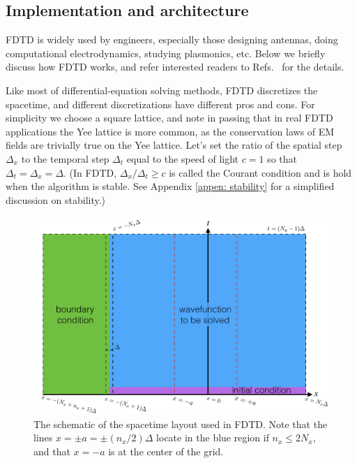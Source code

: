\documentclass[12pt,letter,onecolumn,notitlepage]{article}
\begin{document}
\subsection{Implementation and architecture}
FDTD is widely used by engineers, especially those designing antennas, doing computational electrodynamics, studying plasmonics, etc. 
Below we briefly discuss how FDTD works, and refer interested readers to Refs.~\cite{FDTDbook,FDTDnote} for the details.

Like most of differential-equation solving methods, FDTD discretizes the spacetime, and different discretizations have different pros and cons. For simplicity we choose a square lattice, and note in passing that in real FDTD applications the Yee lattice is more common, as the conservation laws of EM fields are trivially true on the Yee lattice. Let's set the ratio of the spatial step $\Delta_x$  to the temporal step $\Delta_t$  equal to the speed of light $c=1$ so that $\Delta_t=\Delta_x=\Delta$. (In FDTD, $\Delta_x/\Delta_t\geq c$ is called the Courant condition and is hold when the algorithm is stable. See Appendix \ref{appen: stability} for a simplified discussion on stability.)


\begin{figure}[bhtp]
	\centering
	\includegraphics[scale=0.65]{FDTD_schematic}
	\caption{The schematic of the spacetime layout used in FDTD. Note that the lines $x=\pm a=\pm (n_x/2)\Delta$ locate in the blue region if $n_x\leq2N_x$, and that $x=-a$ is at the center of the grid.}
	\label{fig:FDTD_schematic}
\end{figure}
\end{document}
